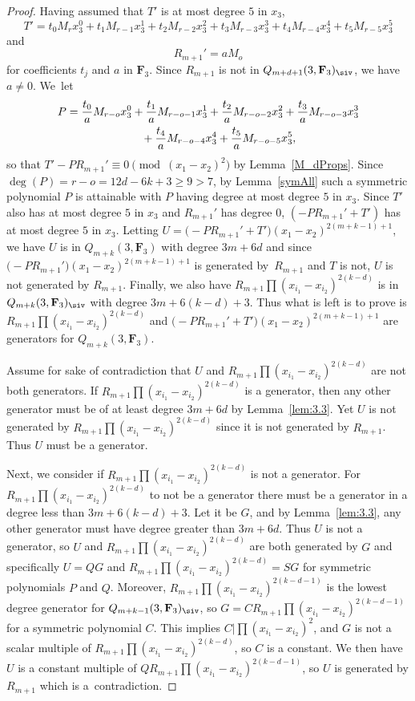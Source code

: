 \begin{proof}
 Having assumed that $T'$ is at most degree $5$ in $x_3$,
 \[T' = t_0M_rx_3^0+t_1M_{r-1}x_3^1+t_2M_{r-2}x_3^2+t_3M_{r-3}x_3^3+t_4M_{r-4}x_3^4+t_5M_{r-5}x_3^5\]
 and
 \[R_{m+1}'=aM_{o}\]
 for coefficients $t_j$ and $a$ in $\mathbf{F}_3$. Since $R_{m+1}$ is not in $Q_{m+d+1}(3,\mathbf{F}_3)_{\siv}$, we have $a\neq 0$. We~let
 \begin{gather*}
 P = \frac{t_0}{a}M_{r-o}x_3^0+\frac{t_1}{a}M_{r-o-1}x_3^1+\frac{t_2}{a}M_{r-o-2}x_3^2+\frac{t_3}{a}M_{r-o-3}x_3^3\\
 \hphantom{P =}{}
 +\frac{t_4}{a}M_{r-o-4}x_3^4+\frac{t_5}{a}M_{r-o-5}x_3^5,
 \end{gather*}
 so that $T'-PR_{m+1}'\equiv 0\pmod{(x_1-x_2)^2}$ by Lemma~\ref{M_dProps}. Since $\deg(P) = r-o = 12d-6k+3\geq 9>7$, by Lemma~\ref{symAll} such a symmetric polynomial $P$ is attainable with $P$ having degree at most degree $5$ in $x_3$.
 Since $T'$ also has at most degree $5$ in $x_3$ and $R_{m+1}'$ has degree $0$, $(-PR_{m+1}'+T')$ has at most degree $5$ in $x_3$. Letting $U=\bigl(-PR_{m+1}'+T'\bigr)(x_1-x_2)^{2(m+k-1)+1}$, we have $U$ is in $Q_{m+k}(3,\mathbf{F}_3)$ with degree $3m+6d$ and since $\bigl(-PR_{m+1}'\bigr)(x_1-x_2)^{2(m+k-1)+1}$ is generated by~$R_{m+1}$ and $T$ is not, $U$ is not generated by $R_{m+1}$. Finally, we also have $R_{m+1}\prod (x_{i_1}-x_{i_2})^{2(k-d)}$ is in $Q_{m+k}(3,\mathbf{F}_3)_{\siv}$ with degree $3m+6(k-d)+3$. Thus what is left is to prove is $R_{m+1}\prod (x_{i_1}-x_{i_2})^{2(k-d)}$ and $\bigl(-PR_{m+1}'+T'\bigr)(x_1-x_2)^{2(m+k-1)+1}$ are generators for $Q_{m+k}(3,\mathbf{F}_3)$.

 Assume for sake of contradiction that $U$ and $R_{m+1}\prod (x_{i_1}-x_{i_2})^{2(k-d)}$ are not both generators. If $R_{m+1}\prod (x_{i_1}-x_{i_2})^{2(k-d)}$ is a generator, then any other generator must be of at least degree $3m+6d$ by Lemma~\ref{lem:3.3}. Yet $U$ is not generated by $R_{m+1}\prod (x_{i_1}-x_{i_2})^{2(k-d)}$ since it is not generated by $R_{m+1}$. Thus $U$ must be a generator.

 Next, we consider if $R_{m+1}\prod (x_{i_1}-x_{i_2})^{2(k-d)}$ is not a generator. For $R_{m+1}\prod (x_{i_1}-x_{i_2})^{2(k-d)}$ to not be a generator there must be a generator in a degree less than $3m+6(k-d)+3$. Let it be $G$, and by Lemma~\ref{lem:3.3}, any other generator must have degree greater than $3m+6d$. Thus $U$ is not a generator, so $U$ and $R_{m+1}\prod (x_{i_1}-x_{i_2})^{2(k-d)}$ are both generated by $G$ and specifically $U=QG$ and $R_{m+1}\prod (x_{i_1}-x_{i_2})^{2(k-d)}=SG$ for symmetric polynomials $P$ and $Q$. Moreover, $R_{m+1}\prod (x_{i_1}-x_{i_2})^{2(k-d-1)}$ is the lowest degree generator for $Q_{m+k-1}(3,\mathbf{F}_3)_{\siv}$, so $G=CR_{m+1}\prod (x_{i_1}-x_{i_2})^{2(k-d-1)}$ for a symmetric polynomial $C$. This implies $C|\prod(x_{i_1}-x_{i_2})^2$, and $G$ is not a scalar multiple of $R_{m+1}\prod (x_{i_1}-x_{i_2})^{2(k-d)}$, so $C$ is a constant. We then have~$U$ is a constant multiple of $QR_{m+1}\prod (x_{i_1}-x_{i_2})^{2(k-d-1)}$, so $U$ is generated by $R_{m+1}$ which is a~contradiction.


\end{proof}
